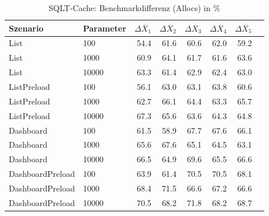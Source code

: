 
\begin{table}[ht]
\setlength{\extrarowheight}{-1pt}
\centering
\caption{SQLT-Cache: Benchmarkdifferenz (Allocs) in \%}
\begin{tabular}{llrrrrrr}
\toprule
Szenario & Parameter & ${\Delta \overline{X}_1}$ & ${\Delta \overline{X}_2}$ & ${\Delta \overline{X}_3}$ & ${\Delta \overline{X}_4}$ & ${\Delta \overline{X}_5}$ \\
\midrule
	List & 100 & \cellcolor{green!28}  54.4 & \cellcolor{green!25}  61.6 & \cellcolor{green!26}  60.6 & \cellcolor{green!25}  62.0 & \cellcolor{green!26}  59.2 \\
	List & 1000 & \cellcolor{green!26}  60.9 & \cellcolor{green!24}  64.1 & \cellcolor{green!25}  61.7 & \cellcolor{green!25}  61.6 & \cellcolor{green!25}  63.6 \\
	List & 10000 & \cellcolor{green!25}  63.3 & \cellcolor{green!25}  61.4 & \cellcolor{green!25}  62.9 & \cellcolor{green!25}  62.4 & \cellcolor{green!25}  63.0 \\
	ListPreload & 100 & \cellcolor{green!28}  56.1 & \cellcolor{green!25}  63.0 & \cellcolor{green!25}  63.1 & \cellcolor{green!24}  63.8 & \cellcolor{green!26}  60.6 \\
	ListPreload & 1000 & \cellcolor{green!25}  62.7 & \cellcolor{green!24}  66.1 & \cellcolor{green!24}  64.4 & \cellcolor{green!25}  63.3 & \cellcolor{green!24}  65.7 \\
	ListPreload & 10000 & \cellcolor{green!23}  67.3 & \cellcolor{green!24}  65.6 & \cellcolor{green!25}  63.6 & \cellcolor{green!24}  64.3 & \cellcolor{green!24}  64.8 \\
	Dashboard & 100 & \cellcolor{green!25}  61.5 & \cellcolor{green!26}  58.9 & \cellcolor{green!23}  67.7 & \cellcolor{green!23}  67.6 & \cellcolor{green!24}  66.1 \\
	Dashboard & 1000 & \cellcolor{green!24}  65.6 & \cellcolor{green!23}  67.6 & \cellcolor{green!24}  65.1 & \cellcolor{green!24}  64.5 & \cellcolor{green!25}  63.1 \\
	Dashboard & 10000 & \cellcolor{green!23}  66.5 & \cellcolor{green!24}  64.9 & \cellcolor{green!22}  69.6 & \cellcolor{green!24}  65.5 & \cellcolor{green!23}  66.6 \\
	DashboardPreload & 100 & \cellcolor{green!24}  63.9 & \cellcolor{green!25}  61.4 & \cellcolor{green!22}  70.5 & \cellcolor{green!22}  70.5 & \cellcolor{green!23}  68.1 \\
	DashboardPreload & 1000 & \cellcolor{green!23}  68.4 & \cellcolor{green!21}  71.5 & \cellcolor{green!23}  66.6 & \cellcolor{green!23}  67.2 & \cellcolor{green!23}  66.6 \\
	DashboardPreload & 10000 & \cellcolor{green!22}  70.5 & \cellcolor{green!23}  68.2 & \cellcolor{green!21}  71.8 & \cellcolor{green!23}  68.2 & \cellcolor{green!23}  68.7 \\
\bottomrule
\end{tabular}
\label{tab:benchmarkdifferenz_sqlt-cache_allocs}
\end{table}
	
